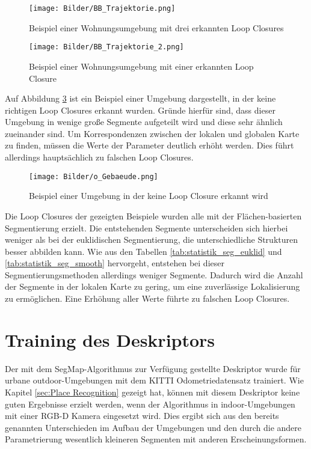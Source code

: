 \begin{figure}
	\centering
	\texttt{[image: Bilder/BB\_Trajektorie.png]}
	\caption{Beispiel einer Wohnungsumgebung mit drei erkannten Loop Closures}
	\label{fig:vgl_trajektorie_bb_3lc}
\end{figure}

\begin{figure}
	\centering
	\texttt{[image: Bilder/BB\_Trajektorie\_2.png]}
	\caption{Beispiel einer Wohnungsumgebung mit einer erkannten Loop Closure}
	\label{fig:vgl_trajektorie_bb_1lc}
\end{figure}

Auf Abbildung \ref{fig:OGebäude} ist ein Beispiel einer Umgebung dargestellt, in der keine richtigen Loop Closures erkannt wurden. Gründe hierfür sind, dass dieser Umgebung in wenige große Segmente aufgeteilt wird und diese sehr ähnlich zueinander sind. Um Korrespondenzen zwischen der lokalen und globalen Karte zu finden, müssen die Werte der Parameter deutlich erhöht werden. Dies führt allerdings hauptsächlich zu falschen Loop Closures. 

\begin{figure}
	\centering
	\texttt{[image: Bilder/o\_Gebaeude.png]}
	\caption{Beispiel einer Umgebung in der keine Loop Closure erkannt wird}
	\label{fig:OGebäude}
\end{figure}

Die Loop Closures der gezeigten Beispiele wurden alle mit der Flächen-basierten Segmentierung erzielt. Die entstehenden Segmente unterscheiden sich hierbei weniger als bei der euklidischen Segmentierung, die unterschiedliche Strukturen besser abbilden kann. Wie aus den Tabellen \ref{tab:statistik_seg_euklid} und \ref{tab:statistik_seg_smooth} hervorgeht, entstehen bei dieser Segmentierungsmethoden allerdings weniger Segmente. Dadurch wird die Anzahl der Segmente in der lokalen Karte zu gering, um eine zuverlässige Lokalisierung zu ermöglichen. Eine Erhöhung aller Werte führte zu falschen Loop Closures. 

\section{Training des Deskriptors}

Der mit dem SegMap-Algorithmus zur Verfügung gestellte Deskriptor wurde für urbane outdoor-Umgebungen mit dem KITTI Odometriedatensatz trainiert. Wie Kapitel \ref{sec:Place Recognition} gezeigt hat, können mit diesem Deskriptor keine guten Ergebnisse erzielt werden, wenn der Algorithmus in indoor-Umgebungen mit einer RGB-D Kamera eingesetzt wird. Dies ergibt sich aus den bereits genannten Unterschieden im Aufbau der Umgebungen und den durch die andere Parametrierung wesentlich kleineren Segmenten mit anderen Erscheinungsformen. 

